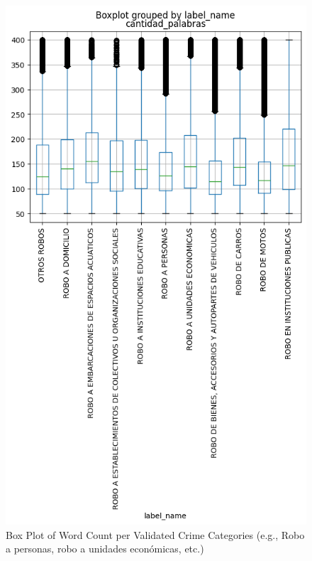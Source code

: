 \documentclass[onecolumn, journal, english, 12pt, a4paper]{IEEEtran} %
\theoremstyle{definition}
\begin{document}
\begin{figure}[h!]
    \centering
    \includegraphics[scale=.8]{imgs/cantidadPalabrasTrainDelitosValidadosBoxPlot.png}
    \caption{Box Plot of Word Count per Validated Crime Categories (e.g., Robo a personas, robo a unidades económicas, etc.)}
    \label{fig:diagramaCajaRelatoTrainValidados}
\end{figure}
\end{document}
